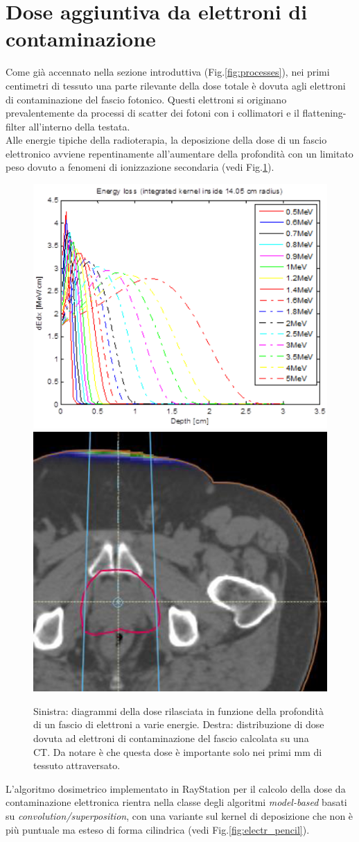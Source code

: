 {\section{Dose aggiuntiva da elettroni di contaminazione}
Come già accennato nella sezione introduttiva (Fig.\ref{fig:processes}), nei primi centimetri di tessuto una parte rilevante della dose totale è dovuta agli elettroni di contaminazione del fascio fotonico. Questi elettroni si originano prevalentemente da processi di scatter dei fotoni con i collimatori e il flattening-filter all'interno della testata.\\
Alle energie tipiche della radioterapia, la deposizione della dose di un fascio elettronico avviene repentinamente all'aumentare della profondità con un limitato peso dovuto a fenomeni di ionizzazione secondaria (vedi Fig.\ref{fig:electr_enloss}).
\begin{figure}
\centering
\includegraphics[width=.45\textwidth]{./cap1/electr_enloss.png}
\includegraphics[width=.45\textwidth]{./cap1/electr_doseCT.png}
\caption{Sinistra: diagrammi della dose rilasciata in funzione della profondità di un fascio di elettroni a varie energie. Destra: distribuzione di dose dovuta ad elettroni di contaminazione del fascio calcolata su una CT. Da notare è che questa dose è importante solo nei primi mm di tessuto attraversato.}
\label{fig:electr_enloss}
\end{figure}

L'algoritmo dosimetrico implementato in RayStation per il calcolo della dose da contaminazione elettronica rientra nella classe degli algoritmi \textit{model-based} basati su \textit{convolution/superposition}, con una variante sul kernel di deposizione che non è più puntuale ma esteso di forma cilindrica (vedi Fig.\ref{fig:electr_pencil}). 

}
